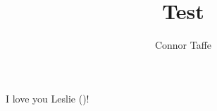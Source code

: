 \documentclass[man,11pt,a4paper,biblatex]{apa6}
\title{Test}
\affiliation{University of Arkansas at Little Rock}
\author{Connor Taffe}
\begin{document}
  \maketitle

  I love you Leslie (\cite{lamport94})!

  \printbibliography
\end{document}
